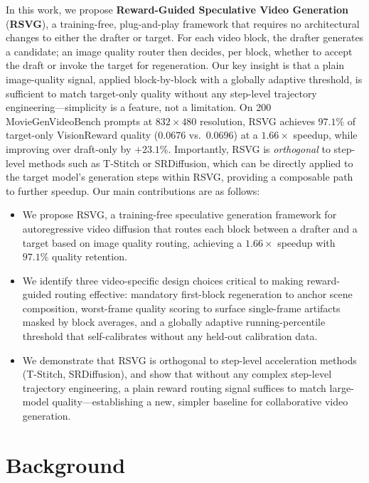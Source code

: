 \documentclass{article}
\begin{document}
In this work, we propose \textbf{Reward-Guided Speculative Video
Generation} (\textbf{RSVG}), a training-free, plug-and-play framework
that requires no architectural changes to either the drafter or target.
For each video block, the drafter generates a candidate; an
image quality router then decides, per
block, whether to accept the draft or invoke the target for
regeneration.
Our key insight is that a plain image-quality signal, applied
block-by-block with a globally adaptive threshold, is sufficient to match
target-only quality without any step-level trajectory engineering---simplicity
is a feature, not a limitation.
On 200 MovieGenVideoBench prompts at $832{\times}480$ resolution, RSVG
achieves $97.1\%$ of target-only VisionReward quality ($0.0676$
vs.\ $0.0696$) at a $\mathbf{1.66\times}$ speedup, while improving over
draft-only by $+23.1\%$.
Importantly, RSVG is \emph{orthogonal} to step-level methods such as
T-Stitch or SRDiffusion, which can be directly applied to the target
model's generation steps within RSVG, providing a composable path to
further speedup.
Our main contributions are as follows:
\begin{itemize}
  \item We propose RSVG, a training-free speculative generation framework
    for autoregressive video diffusion that routes each block between a
    drafter and a target based on image quality routing,
    achieving a $1.66\times$ speedup with $97.1\%$ quality retention.
  \item We identify three video-specific design choices critical to making
    reward-guided routing effective: mandatory first-block regeneration to
    anchor scene composition, worst-frame quality scoring to surface
    single-frame artifacts masked by block averages, and a globally
    adaptive running-percentile threshold that self-calibrates without any
    held-out calibration data.
  \item We demonstrate that RSVG is orthogonal to step-level acceleration
    methods (T-Stitch, SRDiffusion), and show that without any complex
    step-level trajectory engineering, a plain reward routing signal
    suffices to match large-model quality---establishing a new,
    simpler baseline for collaborative video generation.
\end{itemize}

\section{Background}
\end{document}
